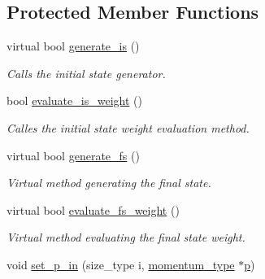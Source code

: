 \subsection*{Protected Member Functions}
\begin{DoxyCompactItemize}
\item 
\hypertarget{a00450_a828487c8d499261d5f25861c92994820}{}virtual bool \hyperlink{a00450_a828487c8d499261d5f25861c92994820}{generate\+\_\+is} ()\label{a00450_a828487c8d499261d5f25861c92994820}

\begin{DoxyCompactList}\small\item\em Calls the initial state generator. \end{DoxyCompactList}\item 
\hypertarget{a00450_aee7daadeecf22c2ba946b70a9609fef9}{}bool \hyperlink{a00450_aee7daadeecf22c2ba946b70a9609fef9}{evaluate\+\_\+is\+\_\+weight} ()\label{a00450_aee7daadeecf22c2ba946b70a9609fef9}

\begin{DoxyCompactList}\small\item\em Calles the initial state weight evaluation method. \end{DoxyCompactList}\item 
\hypertarget{a00450_ad38d14684d6c96c2988130091ffe5c0d}{}virtual bool \hyperlink{a00450_ad38d14684d6c96c2988130091ffe5c0d}{generate\+\_\+fs} ()\label{a00450_ad38d14684d6c96c2988130091ffe5c0d}

\begin{DoxyCompactList}\small\item\em Virtual method generating the final state. \end{DoxyCompactList}\item 
\hypertarget{a00450_ad1d7cd1d11f17a04df7783239b67d4c0}{}virtual bool \hyperlink{a00450_ad1d7cd1d11f17a04df7783239b67d4c0}{evaluate\+\_\+fs\+\_\+weight} ()\label{a00450_ad1d7cd1d11f17a04df7783239b67d4c0}

\begin{DoxyCompactList}\small\item\em Virtual method evaluating the final state weight. \end{DoxyCompactList}\item 
\hypertarget{a00450_a45c1e9624f89e3d61d9559a7f415ad02}{}void \hyperlink{a00450_a45c1e9624f89e3d61d9559a7f415ad02}{set\+\_\+p\+\_\+in} (size\+\_\+type i, \hyperlink{a00579}{momentum\+\_\+type} $\ast$\hyperlink{a00450_ac25aaa44a2bde95d582aac52f85fdfdf}{p})\label{a00450_a45c1e9624f89e3d61d9559a7f415ad02}


\end{DoxyCompactItemize}

